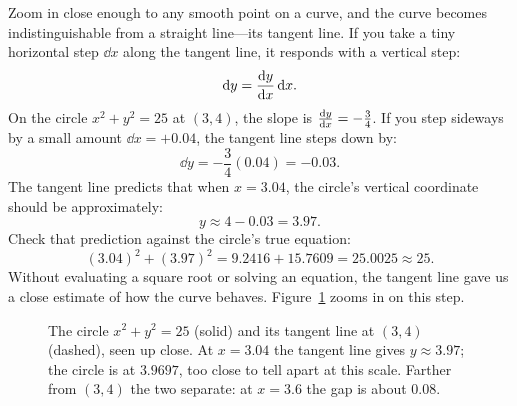 Zoom in close enough to any smooth point on a curve, and the curve becomes indistinguishable from a
straight line---its tangent line. If you take a tiny horizontal step $\dd x$ along the tangent line,
it responds with a vertical step:
\[
\mathrm{d} y = \frac{\mathrm{d} y}{\mathrm{d} x}\,\mathrm{d} x.
\]
On the circle $x^2 + y^2 = 25$ at $(3,4)$, the slope is $\frac{\mathrm{d} y}{\mathrm{d} x} = -\tfrac{3}{4}$. If you step sideways
by a small amount $\dd x = +0.04$, the tangent line steps down by:
\[
\dd y = -\frac{3}{4}(0.04) = -0.03.
\]
The tangent line predicts that when $x = 3.04$, the circle's vertical coordinate should be approximately:
\[
y \approx 4 - 0.03 = 3.97.
\]
Check that prediction against the circle's true equation:
\[
(3.04)^2 + (3.97)^2 = 9.2416 + 15.7609 = 25.0025 \approx 25.
\]
Without evaluating a square root or solving an equation, the tangent line gave
us a close estimate of how the curve behaves. Figure~\ref{ch13:fig-zoom} zooms in on this step.

\begin{figure}[htbp]
\centering
{}
\caption{The circle $x^2+y^2=25$ (solid) and its tangent line at $(3,4)$ (dashed), seen up close. At
$x=3.04$ the tangent line gives $y\approx 3.97$; the circle is at $3.9697$, too close to tell apart
at this scale. Farther from $(3,4)$ the two separate: at $x=3.6$ the gap is about $0.08$.}
\label{ch13:fig-zoom}
\end{figure}

